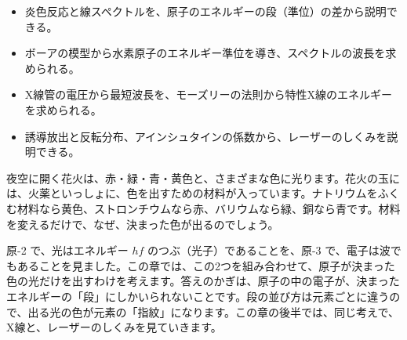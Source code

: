 \newcommand\txeline[3]{\fill[white] ({(#1-380)*0.22-0.3},#2) rectangle ({(#1-380)*0.22+0.3},#2+#3);}
\newcommand\txephoton[3]{\draw[bkOrange!85!black, line width=0.8pt, -{Stealth[length=2mm]}] plot[domain=#1:#2, samples=60] (\x,{#3+0.9*sin((\x-#1)*90)});}
\makeatother


\begin{goal}
\begin{itemize}[label={\color{bkTheme}●}, leftmargin=1.6\zw, itemsep=0pt, topsep=1pt]
\item {}\enspace 炎色反応と線スペクトルを、原子のエネルギーの段（準位）の差から説明できる。
\item {}\enspace ボーアの模型から水素原子のエネルギー準位を導き、スペクトルの波長を求められる。
\item {}\enspace X線管の電圧から最短波長を、モーズリーの法則から特性X線のエネルギーを求められる。
\item {}\enspace 誘導放出と反転分布、アインシュタインの係数から、レーザーのしくみを説明できる。
\end{itemize}
\end{goal}


\begin{hatena}
夜空に開く花火は、赤・緑・青・黄色と、さまざまな色に光ります。花火の玉には、火薬といっしょに、色を出すための材料が入っています。ナトリウムをふくむ材料なら黄色、ストロンチウムなら赤、バリウムなら緑、銅なら青です。材料を変えるだけで、なぜ、決まった色が出るのでしょう。
\end{hatena}

\noindent 原-2 で、光はエネルギー $hf$ のつぶ（光子）であることを、原-3 で、電子は波でもあることを見ました。この章では、この2つを組み合わせて、原子が決まった色の光だけを出すわけを考えます。答えのかぎは、原子の中の電子が、決まったエネルギーの「段」にしかいられないことです。段の並び方は元素ごとに違うので、出る光の色が元素の「指紋」になります。この章の後半では、同じ考えで、X線と、レーザーのしくみを見ていきます。

